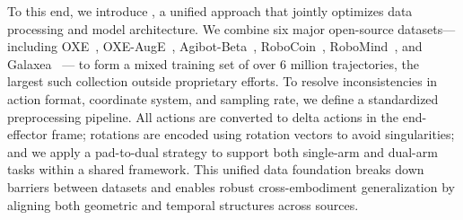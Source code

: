 To this end, we introduce \VLAFM{}, a unified approach that jointly optimizes data processing and model architecture. We combine six major open-source datasets---including OXE~\cite{o2024oxe}, OXE-AugE~\cite{ji2025oxeauge}, Agibot-Beta~\cite{agibotbeta}, RoboCoin~\cite{wu2025robocoin}, RoboMind~\cite{wu2024robomind}, and Galaxea~\cite{jiang2025galaxea} --- to form a mixed training set of over 6 million trajectories, the largest such collection outside proprietary efforts. To resolve inconsistencies in action format, coordinate system, and sampling rate, we define a standardized preprocessing pipeline. All actions are converted to delta actions in the end-effector frame; rotations are encoded using rotation vectors to avoid singularities; and we apply a pad-to-dual strategy to support both single-arm and dual-arm tasks within a shared framework. This unified data foundation breaks down barriers between datasets and enables robust cross-embodiment generalization by aligning both geometric and temporal structures across sources.

